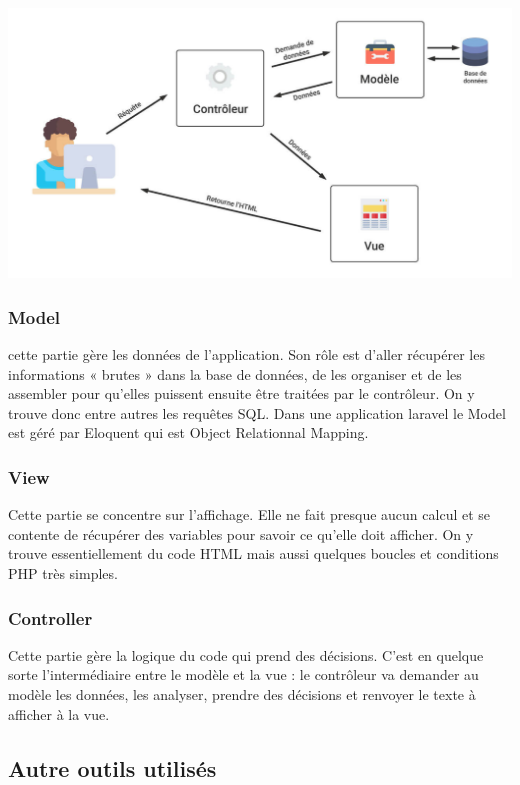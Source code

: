 				\begin{center}
					\includegraphics[scale=0.5]{chap_2/mvc.png}
					\label{logo de MVC}
					\cite{logo_mvc}
				\end{center}
				
			\subsubsection{Model}
				cette partie gère les données de l'application. Son rôle est d'aller récupérer les informations « brutes » dans la base de données, de les organiser et de les assembler pour qu'elles puissent ensuite être traitées par le contrôleur. On y trouve donc entre autres les requêtes SQL\cite{mvc_model}. Dans une application laravel le Model est géré par Eloquent qui est Object Relationnal Mapping.
			\subsubsection{View}
				 Cette partie se concentre sur l'affichage. Elle ne fait presque aucun calcul et se contente de récupérer des variables pour savoir ce qu'elle doit afficher. On y trouve essentiellement du code HTML mais aussi quelques boucles et conditions PHP très simples.
			\subsubsection{Controller}
				Cette partie gère la logique du code qui prend des décisions. C'est en quelque sorte l'intermédiaire entre le modèle et la vue : le contrôleur va demander au modèle les données, les analyser, prendre des décisions et renvoyer le texte à afficher à la vue.
		\subsection{Autre outils utilisés}
